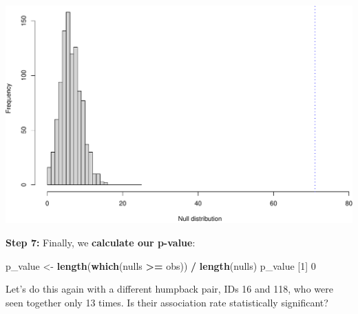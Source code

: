\documentclass[
]{book}
\newenvironment{Shaded}{\begin{snugshade}}{\end{snugshade}}
\newcommand{\DecValTok}[1]{\textcolor[rgb]{0.00,0.00,0.81}{#1}}
\newcommand{\KeywordTok}[1]{\textcolor[rgb]{0.13,0.29,0.53}{\textbf{#1}}}
\newcommand{\NormalTok}[1]{#1}
\newcommand{\OperatorTok}[1]{\textcolor[rgb]{0.81,0.36,0.00}{\textbf{#1}}}
\newcommand{\StringTok}[1]{\textcolor[rgb]{0.31,0.60,0.02}{#1}}
\begin{document}
\includegraphics{figures/unnamed-chunk-595-1.pdf}

\textbf{Step 7:} Finally, we \textbf{calculate our p-value}:

\begin{Shaded}
\begin{Highlighting}[]
\NormalTok{p_value <-}\StringTok{ }\KeywordTok{length}\NormalTok{(}\KeywordTok{which}\NormalTok{(nulls }\OperatorTok{>=}\StringTok{ }\NormalTok{obs)) }\OperatorTok{/}\StringTok{ }\KeywordTok{length}\NormalTok{(nulls)}
\NormalTok{p_value}
\NormalTok{[}\DecValTok{1}\NormalTok{] }\DecValTok{0}
\end{Highlighting}
\end{Shaded}

Let's do this again with a different humpback pair, IDs 16 and 118, who were seen together only 13 times. Is their association rate statistically significant?
\end{document}
